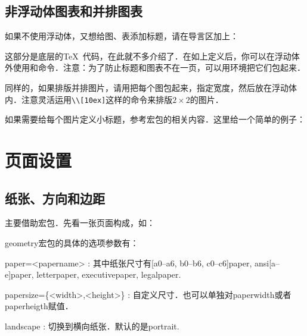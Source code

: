 \subsection{非浮动体图表和并排图表}
如果不使用浮动体，又想给图、表添加标题，请在导言区加上：
\begin{latex}
\makeatletter
\newcommand\figcaption{\def\@captype{figure}\caption}
\newcommand\tabcaption{\def\@captype{table}\caption}
\makeatother
\end{latex}

这部分是底层的\TeX\ 代码，在此就不多介绍了．在如上定义后，你可以在浮动体外使用和命令．注意：为了防止标题和图表不在一页，可以用环境把它们包起来．

同样的，如果排版并排图片，请用把每个图包起来，指定宽度，然后放在浮动体内．注意灵活运用\verb|\\[10ex]|这样的命令来排版$2\times 2$的图片．

如果需要给每个图片定义小标题，参考宏包的相关内容．这里给一个简单的例子：
\begin{latex}
\begin{figure}
\centering
\subfloat[...]{\label{sub-fig-1}
    \begin{minipage}
    \centering
    \texttt{[image: ...]}
    \end{minipage}}
\quad\subfloat[...]
\end{latex}

\section{页面设置}
\label{sec:geometry}
\subsection{纸张、方向和边距}
主要借助宏包．先看一张页面构成，如：
\begin{figure}
\centering

\label{fig:geo-paper}
\end{figure}

geometry宏包的具体的选项参数有：
\begin{para}
\item[paper=<papername>]: 其中纸张尺寸有[a0--a6, b0--b6, c0--c6]paper, ansi[a--e]paper, letterpaper, executivepaper, legalpaper.
\item[papersize=\{<width>,<height>\}]: 自定义尺寸．也可以单独对paperwidth或者paperheigth赋值．
\item[landscape]: 切换到横向纸张．默认的是portrait.
\end{para}

